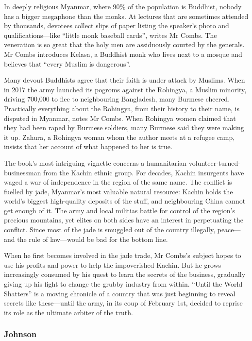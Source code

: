 \documentclass{article}
\begin{document}
In deeply religious Myanmar, where 90\% of the population is Buddhist, nobody has a bigger megaphone than the monks. At lectures that are sometimes attended by thousands, devotees collect slips of paper listing the speaker's photo and qualifications---like ``little monk baseball cards'', writes Mr Combs. The veneration is so great that the holy men are assiduously courted by the generals. Mr Combs introduces Kelasa, a Buddhist monk who lives next to a mosque and believes that ``every Muslim is dangerous''. 

Many devout Buddhists agree that their faith is under attack by Muslims. When in 2017 the army launched its pogroms against the Rohingya, a Muslim minority, driving 700,000 to flee to neighbouring Bangladesh, many Burmese cheered. Practically everything about the Rohingya, from their history to their name, is disputed in Myanmar, notes Mr Combs. When Rohingya women claimed that they had been raped by Burmese soldiers, many Burmese said they were making it up. Zahura, a Rohingya woman whom the author meets at a refugee camp, insists that her account of what happened to her is true. 

The book's most intriguing vignette concerns a humanitarian volunteer-turned-businessman from the Kachin ethnic group. For decades, Kachin insurgents have waged a war of independence in the region of the same name. The conflict is fuelled by jade, Myanmar's most valuable natural resource: Kachin holds the world's biggest high-quality deposits of the stuff, and neighbouring China cannot get enough of it. The army and local militias battle for control of the region's precious mountains, yet elites on both sides have an interest in perpetuating the conflict. Since most of the jade is smuggled out of the country illegally, peace---and the rule of law---would be bad for the bottom line. 

When he first becomes involved in the jade trade, Mr Combs's subject hopes to use his profits and power to help the impoverished Kachin. But he grows increasingly consumed by his quest to learn the secrets of the business, gradually giving up his fight to change the grubby industry from within. ``Until the World Shatters'' is a moving chronicle of a country that was just beginning to reveal secrets like these---until the army, in its coup of February 1st, decided to reprise its role as the ultimate arbiter of the truth. {} 
\clearpage
\subsubsection{Johnson }
\end{document}

